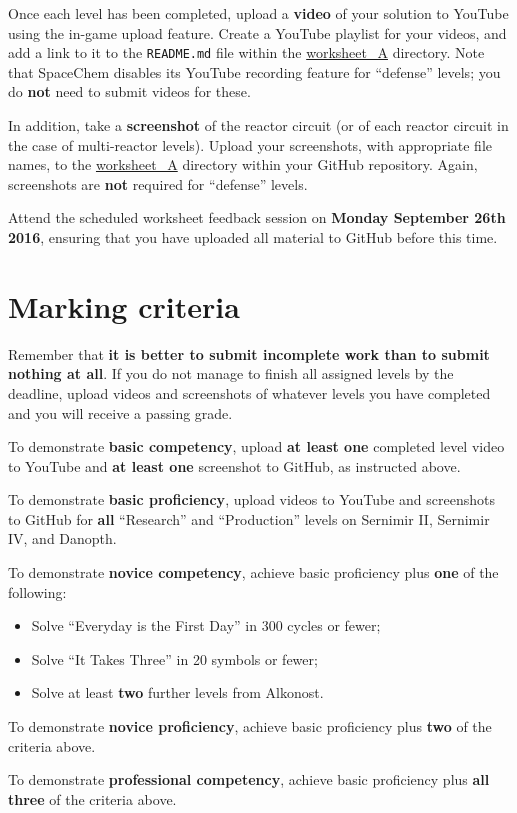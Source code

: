 \documentclass{../../../fal_assignment}
\begin{document}
Once each level has been completed, upload a \textbf{video} of your solution to YouTube using the in-game upload feature.
Create a YouTube playlist for your videos, and add a link to it to the \texttt{README.md} file within the \url{worksheet_A} directory.
Note that SpaceChem disables its YouTube recording feature for ``defense'' levels; you do \textbf{not} need to submit videos for these.

In addition, take a \textbf{screenshot} of the reactor circuit (or of each reactor circuit in the case of multi-reactor levels). Upload your screenshots, with appropriate file names, to the \url{worksheet_A} directory within your GitHub repository. Again, screenshots are \textbf{not} required for ``defense'' levels.

Attend the scheduled worksheet feedback session on \textbf{Monday September 26th 2016},
ensuring that you have uploaded all material to GitHub before this time.

\section*{Marking criteria}

Remember that \textbf{it is better to submit incomplete work than to submit nothing at all}. If you do not manage to finish all assigned levels by the deadline, upload videos and screenshots of whatever levels you have completed and you will receive a passing grade.

To demonstrate \textbf{basic competency}, upload \textbf{at least one} completed level video to YouTube and \textbf{at least one} screenshot to GitHub, as instructed above.

To demonstrate \textbf{basic proficiency}, upload videos to YouTube and screenshots to GitHub for \textbf{all} ``Research'' and ``Production'' levels on Sernimir II, Sernimir IV, and Danopth.

To demonstrate \textbf{novice competency}, achieve basic proficiency plus \textbf{one} of the following:
	\begin{itemize}
		\item Solve ``Everyday is the First Day'' in 300 cycles or fewer;
		\item Solve ``It Takes Three'' in 20 symbols or fewer;
		\item Solve at least \textbf{two} further levels from Alkonost.
	\end{itemize}

To demonstrate \textbf{novice proficiency}, achieve basic proficiency plus \textbf{two} of the criteria above.

To demonstrate \textbf{professional competency}, achieve basic proficiency plus \textbf{all three} of the criteria above.
\end{document}
